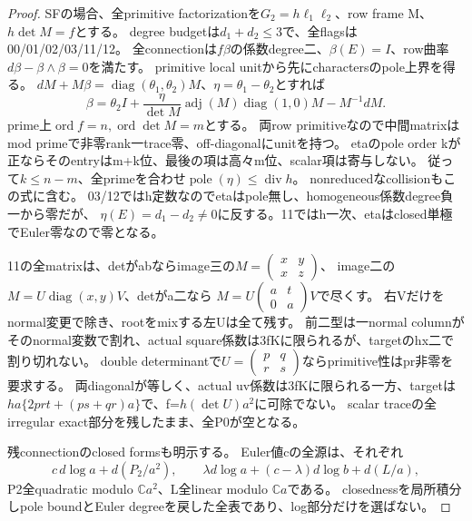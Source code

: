 \documentclass[a4paper,11pt]{ltjsarticle}
\theoremstyle{definition}
\begin{document}
\begin{proof}
SFの場合、全primitive factorizationを$G_2=h\ell_1\ell_2$、row frame M、$h\det M=f$とする。
degree budgetは$d_1+d_2\le3$で、全flagsは00/01/02/03/11/12。
全connectionは$f\beta$の係数degree二、$\beta(E)=I$、row曲率$d\beta-\beta\wedge\beta=0$を満たす。
primitive local unitから先にcharactersのpole上界を得る。
$dM+M\beta=\operatorname{diag}(\theta_1,\theta_2)M$、$\eta=\theta_1-\theta_2$とすれば
\[
 \beta=\theta_2I+\frac{\eta}{\det M}\operatorname{adj}(M)
       \operatorname{diag}(1,0)M-M^{-1}dM.
\]
prime上$\operatorname{ord}f=n,\operatorname{ord}\det M=m$とする。
両row primitiveなので中間matrixはmod primeで非零rank一trace零、off-diagonalにunitを持つ。
etaのpole order kが正ならそのentryはm+k位、最後の項は高々m位、scalar項は寄与しない。
従って$k\le n-m$、全primeを合わせ$\operatorname{pole}(\eta)\le\operatorname{div}h$。
nonreducedなcollisionもこの式に含む。
03/12ではh定数なのでetaはpole無し、homogeneous係数degree負一から零だが、
$\eta(E)=d_1-d_2\ne0$に反する。11ではh一次、etaはclosed単極でEuler零なので零となる。

11の全matrixは、detがabならimage三の$M=\left(\begin{smallmatrix}x&y\\x&z\end{smallmatrix}\right)$、
image二の$M=U\operatorname{diag}(x,y)V$、detがa二なら
$M=U\left(\begin{smallmatrix}a&t\\0&a\end{smallmatrix}\right)V$で尽くす。
右Vだけをnormal変更で除き、rootをmixする左Uは全て残す。
前二型は一normal columnがそのnormal変数で割れ、actual square係数は3fKに限られるが、targetのhx二で割り切れない。
double determinantで$U=\left(\begin{smallmatrix}p&q\\r&s\end{smallmatrix}\right)$ならprimitive性はpr非零を要求する。
両diagonalが等しく、actual uv係数は3fKに限られる一方、targetは
$ha\{2pr t+(ps+qr)a\}$で、f=$h(\det U)a^2$に可除でない。
scalar traceの全irregular exact部分を残したまま、全P0が空となる。

残connectionのclosed formsも明示する。
Euler値cの全源は、それぞれ
\[
 c\,d\log a+d(P_2/a^2),\qquad
 \lambda d\log a+(c-\lambda)d\log b+d(L/a),
\]
P2全quadratic modulo $\mathbb Ca^2$、L全linear modulo $\mathbb Ca$である。
closednessを局所積分しpole boundとEuler degreeを戻した全表であり、log部分だけを選ばない。


\end{proof}
\end{document}
